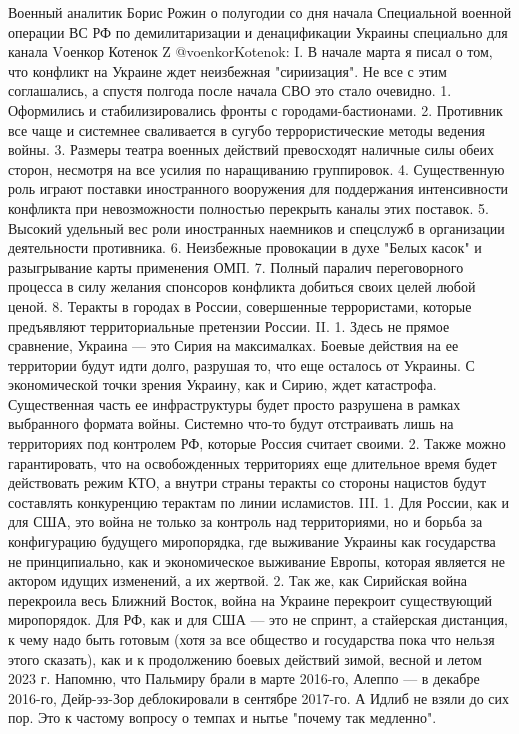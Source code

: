 Военный аналитик Борис Рожин о полугодии со дня начала Специальной военной операции ВС РФ по демилитаризации и денацификации Украины специально для канала Vоенкор Котенок Z @voenkorKotenok:
I.
В начале марта я писал о том, что конфликт на Украине ждет неизбежная "сириизация". Не все с этим соглашались, а спустя полгода после начала СВО это стало очевидно.
1. Оформились и стабилизировались фронты с городами-бастионами.
2. Противник все чаще и системнее сваливается в сугубо террористические методы ведения войны.
3. Размеры театра военных действий превосходят наличные силы обеих сторон, несмотря на все усилия по наращиванию группировок.
4. Существенную роль играют поставки иностранного вооружения для поддержания интенсивности конфликта при невозможности полностью перекрыть каналы этих поставок.
5. Высокий удельный вес роли иностранных наемников и спецслужб в организации деятельности противника.
6. Неизбежные провокации в духе "Белых касок" и разыгрывание карты применения ОМП.
7. Полный паралич переговорного процесса в силу желания спонсоров конфликта добиться своих целей любой ценой.
8. Теракты в городах в России, совершенные террористами, которые предъявляют территориальные претензии России.
II.
1. Здесь не прямое сравнение, Украина — это Сирия на максималках. Боевые действия на ее территории будут идти долго, разрушая то, что еще осталось от Украины. С экономической точки зрения Украину, как и Сирию, ждет катастрофа. Существенная часть ее инфраструктуры будет просто разрушена в рамках выбранного формата войны. Системно что-то будут отстраивать лишь на территориях под контролем РФ, которые Россия считает своими.
2. Также можно гарантировать, что на освобожденных территориях еще длительное время будет действовать режим КТО, а внутри страны теракты со стороны нацистов будут составлять конкуренцию терактам по линии исламистов.
III.
1. Для России, как и для США, это война не только за контроль над территориями, но и борьба за конфигурацию будущего миропорядка, где выживание Украины как государства не принципиально, как и экономическое выживание Европы, которая является не актором идущих изменений, а их жертвой.
2. Так же, как Сирийская война перекроила весь Ближний Восток, война на Украине перекроит существующий миропорядок. Для РФ, как и для США — это не спринт, а стайерская дистанция, к чему надо быть готовым (хотя за все общество и государства пока что нельзя этого сказать), как и к продолжению боевых действий зимой, весной и летом 2023 г.
Напомню, что Пальмиру брали в марте 2016-го, Алеппо — в декабре 2016-го, Дейр-эз-Зор деблокировали в сентябре 2017-го. А Идлиб не взяли до сих пор. Это к частому вопросу о темпах и нытье "почему так медленно".
